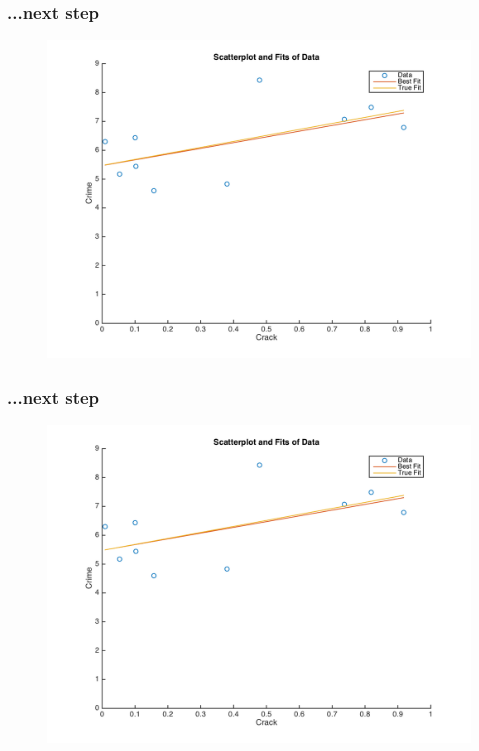 \documentclass{beamer}
\begin{document}
\begin{frame}
\frametitle[alignment=center]{...next step}
\begin{figure}
\centering
\includegraphics[scale=0.5]{Newton_OLS_Figure_22.png}
\end{figure}
\end{frame}

\begin{frame}
\frametitle[alignment=center]{...next step}
\begin{figure}
\centering
\includegraphics[scale=0.5]{Newton_OLS_Figure_23.png}
\end{figure}
\end{frame}
\end{document}
